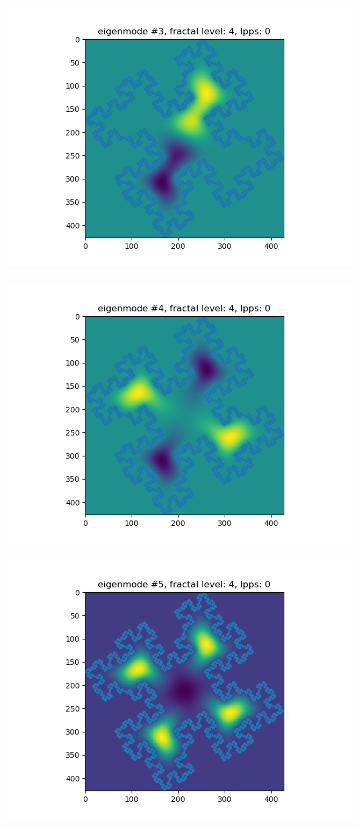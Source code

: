 \documentclass{article}
\begin{document}
\begin{figure}
\begin{subfigure}{0.3\textwidth}
        \includegraphics[width=\linewidth]{../figs/eigenmode_2d3.png}
    \end{subfigure}
    \begin{subfigure}{0.3\textwidth}
        \includegraphics[width=\linewidth]{../figs/eigenmode_2d4.png}
    \end{subfigure}
    \begin{subfigure}{0.3\textwidth}
        \includegraphics[width=\linewidth]{../figs/eigenmode_2d5.png}

\end{subfigure}
\end{figure}
\end{document}
